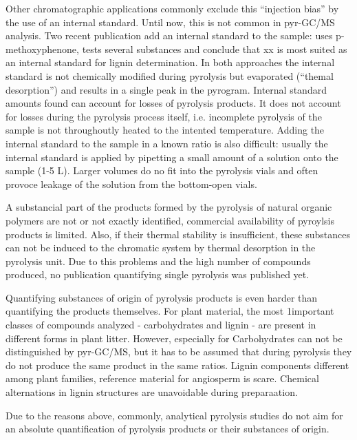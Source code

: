 Other chromatographic applications commonly exclude this ``injection bias'' by the use of an internal standard. Until now, this is not common in pyr-GC/MS analysis. Two recent publication add an internal standard to the sample: \cite{Steinbeiss2006} uses p-methoxyphenone, \cite{Bocchini1997} tests several substances and conclude that xx is most suited as an internal standard for lignin determination. In both approaches the internal standard is not chemically modified during pyrolysis but evaporated (``themal desorption'') and results in a single peak in the pyrogram. Internal standard amounts found can account for losses of pyrolysis products. It does not account for losses during the pyrolysis process itself, i.e. incomplete pyrolysis of the sample is not throughoutly heated to the intented temperature. Adding the internal standard to the sample in a known ratio is also difficult: usually the internal standard is applied by pipetting a small amount of a solution onto the sample (1-5 \textmu L). Larger volumes do no fit into the pyrolysis vials and often provoce leakage of the solution from the bottom-open vials.

A substancial part of the products formed by the pyrolysis of natural organic polymers are not or not exactly identified, commercial availability of pyroylsis products is limited. Also, if their thermal stability is insufficient, these substances can not be induced to the chromatic system by thermal desorption in the pyrolysis unit. Due to this problems and the high number of compounds produced, no publication quantifying single pyrolysis was published yet.

Quantifying substances of origin of pyrolysis products is even harder than quantifying the products themselves. For plant material, the most 1important classes of compounds analyzed - carbohydrates and lignin - are present in different forms in plant litter. However, especially for Carbohydrates can not be distinguished by pyr-GC/MS, but it has to be assumed that during pyrolysis they do not produce the same product in the same ratios. Lignin components different among plant families, reference material for angiosperm is scare. Chemical alternations in lignin structures are unavoidable during preparaation.


Due to the reasons above, commonly, analytical pyrolysis studies do not aim for an absolute quantification of pyrolysis products or their substances of origin. 



